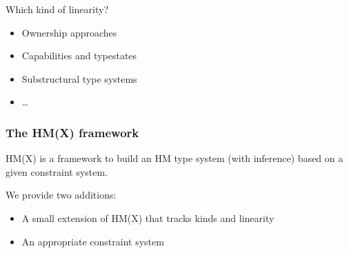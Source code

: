 \documentclass[xcolor=svgnames,11pt]{beamer}
\begin{document}
\begin{frame}
  Which kind of linearity?
  \begin{itemize}
  \item \alert<2>{Ownership approaches}
    
  \item \alert<3>{Capabilities and typestates}
    
  \item \alert<4,6>{Substructural type systems}
    
  \item \alert<5>{\dots}
    
  \end{itemize}
\end{frame}

\begin{frame}
  \frametitle{The HM(X) framework}
  HM(X) \citep{DBLP:journals/tapos/OderskySW99} is a framework
  to build an HM type system (with inference) based on a given constraint system.

  We provide two additions:
  \begin{itemize}
  \item A small extension of HM(X) that tracks kinds and linearity
  \item An appropriate constraint system
  \end{itemize}
\end{frame}



\end{document}
